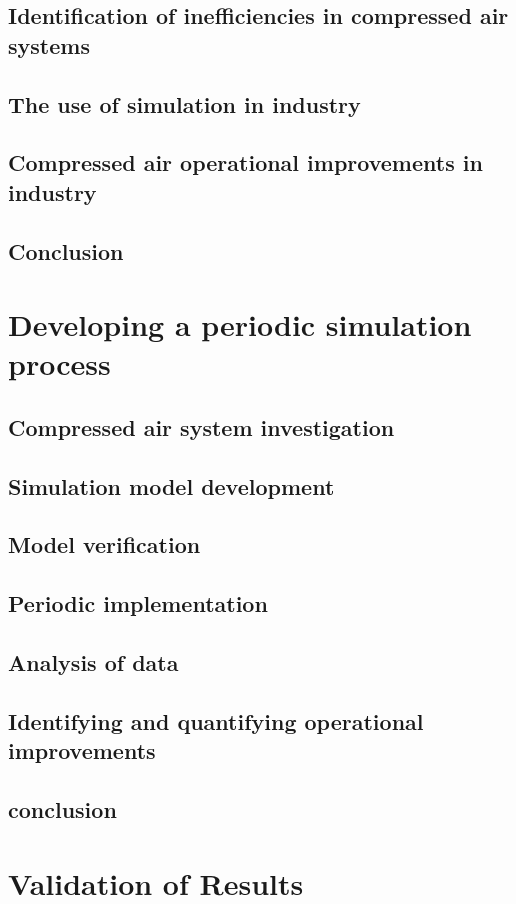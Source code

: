 \documentclass[12pt, english, oneside, singlespacing, open=any]{report}
\begin{document}
	\section{Identification of inefficiencies in compressed air systems}
	\section{The use of simulation in industry}
	\section{Compressed air operational improvements in industry}
	\section{Conclusion}

\chapter{Developing a periodic simulation process}
	\section{Compressed air system investigation}
	\section{Simulation model development}
	\section{Model verification}
	\section{Periodic implementation}
	\section{Analysis of data}
	\section{Identifying and quantifying operational improvements}
	\section{conclusion}
	
\chapter{Validation of Results}
\end{document}
